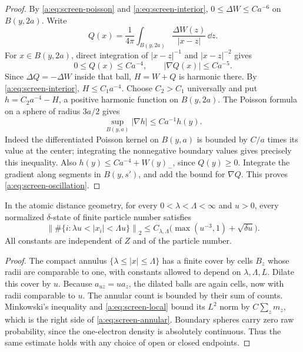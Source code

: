 \begin{proof}
By \eqref{a:eq:screen-poisson} and \eqref{a:eq:screen-interior},
$0\le\Delta W\le Ca^{-6}$ on $B(y,2a)$.  Write
\[
 Q(x)=\frac1{4\pi}
       \int_{B(y,2a)}\frac{\Delta W(z)}{|x-z|}\,\dd z.
\]
For $x\in B(y,2a)$, direct integration of $|x-z|^{-1}$ and
$|x-z|^{-2}$ gives
\[
 0\le Q(x)\le Ca^{-4},\qquad |\nabla Q(x)|\le Ca^{-5}.
\]
Since $\Delta Q=-\Delta W$ inside that ball,
$H=W+Q$ is harmonic there.  By \eqref{a:eq:screen-interior},
$H\le C_1a^{-4}$.  Choose $C_2>C_1$ universally and put
$h=C_2a^{-4}-H$, a positive harmonic function on $B(y,2a)$.
The Poisson formula on a sphere of radius $3a/2$ gives
\[
 \sup_{B(y,a)}|\nabla h|\le Ca^{-1}h(y).
\]
Indeed the differentiated Poisson kernel on $B(y,a)$ is bounded
by $C/a$ times its value at the center; integrating the
nonnegative boundary values gives precisely this inequality.
Also $h(y)\le Ca^{-4}+W(y)_-$, since $Q(y)\ge0$.
Integrate the gradient along segments in $B(y,s')$, and add
the bound for $\nabla Q$.  This proves
\eqref{a:eq:screen-oscillation}.
\end{proof}

\begin{corollary}
\label{a:cor:screen-annular}
In the atomic distance geometry, for every
$0<\lambda<\Lambda<\infty$ and $u>0$, every normalized
$\delta$-state of finite particle number satisfies
\begin{equation}\label{a:eq:screen-annular}
 \left\|\#\{i:\lambda u<|x_i|<\Lambda u\}\right\|_2
 \le C_{\lambda,\Lambda}
       \bigl(\max(u^{-3},1)+\sqrt{\delta u}\bigr).
\end{equation}
All constants are independent of $Z$ and of the particle number.
\end{corollary}

\begin{proof}
The compact annulus $\{\lambda\le|x|\le\Lambda\}$ has a finite
cover by cells $B_z$ whose radii are comparable to one, with
constants allowed to depend on $\lambda,\Lambda,L$.  Dilate this
cover by $u$.  Because $a_{uz}=ua_z$, the dilated balls are
again cells, now with radii comparable to $u$.  The annular count
is bounded by their sum of counts.  Minkowski's inequality and
\eqref{a:eq:screen-local} bound its $L^2$ norm by $C\sum_z m_z$,
which is the right side of \eqref{a:eq:screen-annular}.  Boundary
spheres carry zero raw probability, since the one-electron
density is absolutely continuous.  Thus the same estimate holds
with any choice of open or closed endpoints.
\end{proof}
